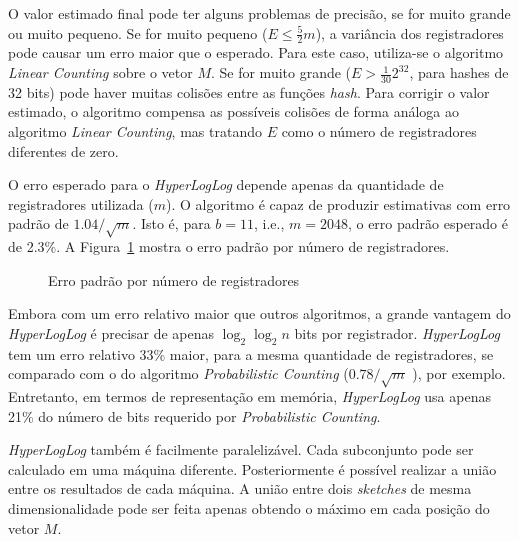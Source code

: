 O valor estimado final pode ter alguns problemas de precisão, se for muito grande ou muito pequeno. Se for muito pequeno ($E \leq \frac{5}{2}m$), a variância dos registradores pode causar um erro maior que o esperado. Para este caso, utiliza-se o algoritmo \emph{Linear Counting} \cite{whang1990linear} sobre o vetor $M$. Se for muito grande ($E > \frac{1}{30}2^{32}$, para hashes de 32 bits) pode haver muitas colisões entre as funções \emph{hash}. Para corrigir o valor estimado, o algoritmo compensa as possíveis colisões de forma análoga ao algoritmo \emph{Linear Counting}, mas tratando $E$ como o número de registradores diferentes de zero.

O erro esperado para o \emph{HyperLogLog} depende apenas da quantidade de registradores utilizada ($m$). O algoritmo é capaz de produzir estimativas com erro padrão de $1.04/\sqrt{m}$. Isto é, para $b=11$, i.e., $m=2048$, o erro padrão esperado é de 2.3\%. A Figura~\ref{fig:hll:proberr} mostra o erro padrão por número de registradores.

\begin{figure}[!htbp]
\centering
{}
\caption{Erro padrão por número de registradores}
\label{fig:hll:proberr}
\end{figure}

Embora com um erro relativo maior que outros algoritmos, a grande vantagem do \emph{HyperLogLog} é precisar de apenas $\log_2 \log_2 n$ bits por registrador. \emph{HyperLogLog} tem um erro relativo 33\% maior, para a mesma quantidade de registradores, se comparado com o do algoritmo \emph{Probabilistic Counting} ($0.78 / \sqrt{m}$ \cite{flajolet1985probabilistic}), por exemplo. Entretanto, em termos de representação em memória, \emph{HyperLogLog} usa apenas 21\% do número de bits requerido por \emph{Probabilistic Counting}.

\emph{HyperLogLog} também é facilmente paralelizável. Cada subconjunto pode ser calculado em uma máquina diferente. Posteriormente é possível realizar a união entre os resultados de cada máquina. A união entre dois \emph{sketches} de mesma dimensionalidade pode ser feita apenas obtendo o máximo em cada posição do vetor $M$.

